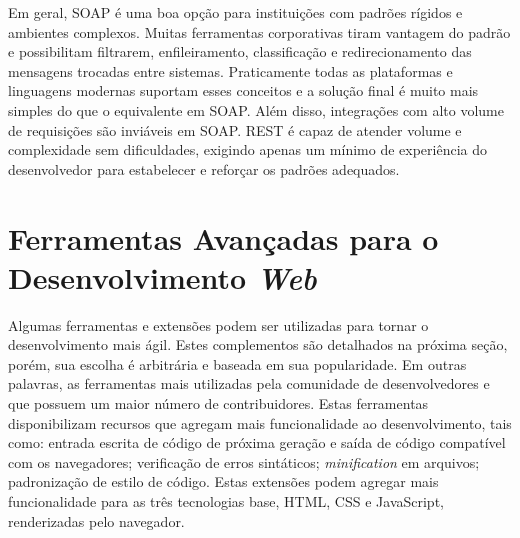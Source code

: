 Em geral, SOAP é uma boa opção para instituições com padrões rígidos e ambientes complexos. Muitas ferramentas corporativas tiram vantagem do padrão e possibilitam filtrarem, enfileiramento, classificação e redirecionamento das mensagens trocadas entre sistemas. Praticamente todas as plataformas e linguagens modernas suportam esses conceitos e a solução final é muito mais simples do que o equivalente em SOAP. Além disso, integrações com alto volume de requisições são inviáveis em SOAP. REST é capaz de atender volume e complexidade sem dificuldades, exigindo apenas um mínimo de experiência do desenvolvedor para estabelecer e reforçar os padrões adequados.
%
%
%
%
%
%
%
%
%
\section{Ferramentas Avançadas para o Desenvolvimento \textit{Web}}
\label{FerramentasWeb}

Algumas ferramentas e extensões podem ser utilizadas para tornar o desenvolvimento mais ágil. Estes complementos são detalhados na próxima seção, porém, sua escolha é arbitrária e baseada em sua popularidade. Em outras palavras, as ferramentas mais utilizadas pela comunidade de desenvolvedores e que possuem um maior número de contribuidores. Estas ferramentas disponibilizam recursos que agregam mais funcionalidade ao desenvolvimento, tais como: entrada escrita de código de próxima geração e saída de código compatível com os navegadores; verificação de erros sintáticos; \textit{minification} em arquivos; padronização de estilo de código. Estas extensões podem agregar mais funcionalidade para as três tecnologias base, HTML, CSS e JavaScript, renderizadas pelo navegador.